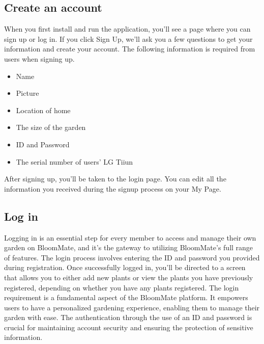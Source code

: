 \documentclass[conference, a4paper]{IEEEtran}
\begin{document}
\subsection{Create an account}
When you first install and run the application, you'll see a page where you can sign up or log in. If you click Sign Up, we'll ask you a few questions to get your information and create your account. The following information is required from users when signing up.
\begin{itemize}
    \item Name
    \item Picture
    \item Location of home
    \item The size of the garden
    \item ID and Password
    \item The serial number of users' LG Tiiun
\end{itemize}
After signing up, you’ll be taken to the login page. You can edit all the information you received during the signup process on your My Page.\\
\subsection{Log in}
Logging in is an essential step for every member to access and manage their own garden on BloomMate, and it's the gateway to utilizing BloomMate's full range of features. The login process involves entering the ID and password you provided during registration. Once successfully logged in, you'll be directed to a screen that allows you to either add new plants or view the plants you have previously registered, depending on whether you have any plants registered. The login requirement is a fundamental aspect of the BloomMate platform. It empowers users to have a personalized gardening experience, enabling them to manage their garden with ease. The authentication through the use of an ID and password is crucial for maintaining account security and ensuring the protection of sensitive information. \\
\end{document}
